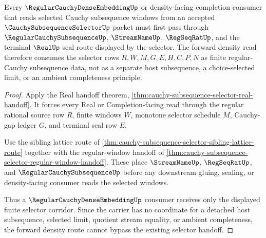 \begin{theorem}
\label{thm:cauchy-subsequence-selector-forward-density-route}
Every $\RegularCauchyDenseEmbeddingUp$ or density-facing completion consumer that reads selected Cauchy subsequence windows from an accepted $\CauchySubsequenceSelectorUp$ packet must first pass through $\RegularCauchySubsequenceUp$, $\StreamNameUp$, $\RegSeqRatUp$, and the terminal $\RealUp$ seal route displayed by the selector. The forward density read therefore consumes the selector rows $R,W,M,G,E,H,C,P,N$ as finite regular-Cauchy subsequence data, not as a separate host subsequence, a choice-selected limit, or an ambient completeness principle.
\end{theorem}
\begin{proof}
Apply the Real handoff theorem, \autoref{thm:cauchy-subsequence-selector-real-handoff}. It forces every Real or Completion-facing read through the regular rational source row $R$, finite windows $W$, monotone selector schedule $M$, Cauchy-gap ledger $G$, and terminal seal row $E$.

Use the sibling lattice route of \autoref{thm:cauchy-subsequence-selector-sibling-lattice-route} together with the regular-window handoff of \autoref{thm:cauchy-subsequence-selector-regular-window-handoff}. These place $\StreamNameUp$, $\RegSeqRatUp$, and $\RegularCauchySubsequenceUp$ before any downstream gluing, sealing, or density-facing consumer reads the selected windows.

Thus a $\RegularCauchyDenseEmbeddingUp$ consumer receives only the displayed finite selector corridor. Since the carrier has no coordinate for a detached host subsequence, selected limit, quotient stream equality, or ambient completeness, the forward density route cannot bypass the existing selector handoff.
\end{proof}


\begin{closurestatus}{\CauchySubsequenceSelectorUp}
  \theoryclosure{\seedClosure}
  \formalstatus{\unformalizedV}
\end{closurestatus}
